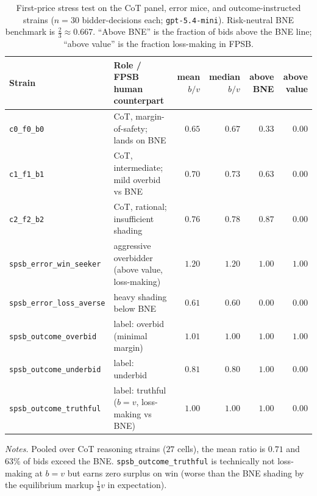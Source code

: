 \documentclass[12pt]{article}
\begin{document}
\begin{table}[t]
\centering
\caption{First-price stress test on the CoT panel, error mice, and
outcome-instructed strains ($n=30$ bidder-decisions each;
\texttt{gpt-5.4-mini}). Risk-neutral BNE benchmark is
$\tfrac{2}{3}\approx 0.667$. ``Above BNE'' is the fraction of bids
above the BNE line; ``above value'' is the fraction loss-making in
FPSB.}
\label{tab:fpsb}
\small
\setlength{\tabcolsep}{5pt}
\begin{tabular}{@{}llrrrr@{}}
\toprule
Strain & Role / FPSB human counterpart & mean $b/v$ & median $b/v$ & above BNE & above value \\
\midrule
\texttt{c0\_f0\_b0}  & CoT, margin-of-safety; lands on BNE       & $0.65$ & $0.67$ & $0.33$ & $0.00$ \\
\texttt{c1\_f1\_b1}  & CoT, intermediate; mild overbid vs BNE    & $0.70$ & $0.73$ & $0.63$ & $0.00$ \\
\texttt{c2\_f2\_b2}  & CoT, rational; insufficient shading       & $0.76$ & $0.78$ & $0.87$ & $0.00$ \\
\addlinespace
\texttt{spsb\_error\_win\_seeker}  & aggressive overbidder (above value, loss-making) & $1.20$ & $1.20$ & $1.00$ & $1.00$ \\
\texttt{spsb\_error\_loss\_averse} & heavy shading below BNE                          & $0.61$ & $0.60$ & $0.00$ & $0.00$ \\
\addlinespace
\texttt{spsb\_outcome\_overbid}    & label: overbid (minimal margin)          & $1.01$ & $1.00$ & $1.00$ & $1.00$ \\
\texttt{spsb\_outcome\_underbid}   & label: underbid                          & $0.81$ & $0.80$ & $1.00$ & $0.00$ \\
\texttt{spsb\_outcome\_truthful}   & label: truthful ($b=v$, loss-making vs BNE) & $1.00$ & $1.00$ & $1.00$ & $0.00$ \\
\bottomrule
\end{tabular}

\vspace{0.4em}
\begin{minipage}{0.95\textwidth}
{\footnotesize\textit{Notes.} Pooled over CoT reasoning strains
($27$ cells), the mean ratio is $0.71$ and $63\%$ of bids exceed
the BNE. \texttt{spsb\_outcome\_truthful} is technically not
loss-making at $b{=}v$ but earns zero surplus on win (worse than
the BNE shading by the equilibrium markup
$\tfrac{1}{3}v$ in expectation).\par}
\end{minipage}
\end{table}
\end{document}
